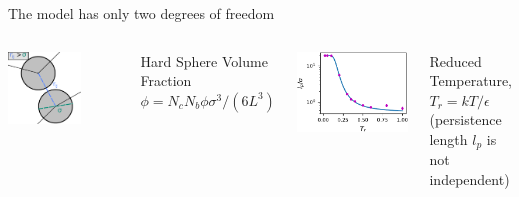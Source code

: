 \documentclass[aspectratio=169]{beamer}
\begin{document}
\begin{frame}[c]{The model has only two degrees of freedom}
  \begin{columns}[T]


    \centering
    \includegraphics[width=0.65\textwidth]{../figures/fig-hard_tang_step_model/fig-HS_pair_pot.pdf}

    \vspace{14pt}
    \begin{block}{}
      \centering
      Hard Sphere Volume Fraction\\
      $\phi = N_{c} N_{b} \phi \sigma^{3}/(6 L^{3})$
    \end{block}


    \centering
    \includegraphics[width=\textwidth]{../figures/fig-step_lp_vs_T/fig-lp_vs_T.pdf}

    \begin{block}{}
      \centering
      Reduced Temperature, $T_{r}=kT/\epsilon$ \\
      (persistence length $l_{p}$ is not independent)
    \end{block}

  \end{columns}
\end{frame}
\end{document}
